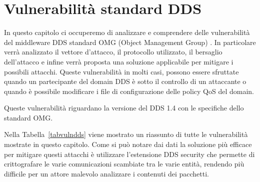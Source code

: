 \chapter{Vulnerabilità standard DDS}


In questo capitolo ci occuperemo di analizzare e comprendere delle vulnerabilità
del middleware DDS standard OMG (Object Management Group) \cite{8469351}. 
In particolare
verrà analizzato il vettore d'attacco, il protocollo utilizzato, il bersaglio
dell'attacco e infine verrà proposta una soluzione applicabile per
mitigare i possibili attacchi. %
Queste vulnerabilità in molti casi, possono essere sfruttate 
quando un partecipante del domain DDS è sotto il controllo di un attaccante
o quando è possibile modificare i file di configurazione delle policy QoS 
del domain.

Queste vulnerabilità riguardano la versione del DDS 1.4 con le specifiche 
dello standard OMG.

Nella Tabella~\ref{tabvulndds} viene mostrato un riassunto di tutte
le vulnerabilità mostrate in questo capitolo. Come si può notare dai dati 
la soluzione più efficace per mitigare questi attacchi è utilizzare 
l'estensione DDS security che permette di crittografare le varie comunicazioni
scambiate tra le varie entità, rendendo più difficile per un attore 
malevolo
analizzare i contenuti dei pacchetti.







\setlength{\arrayrulewidth}{1.0pt} %


